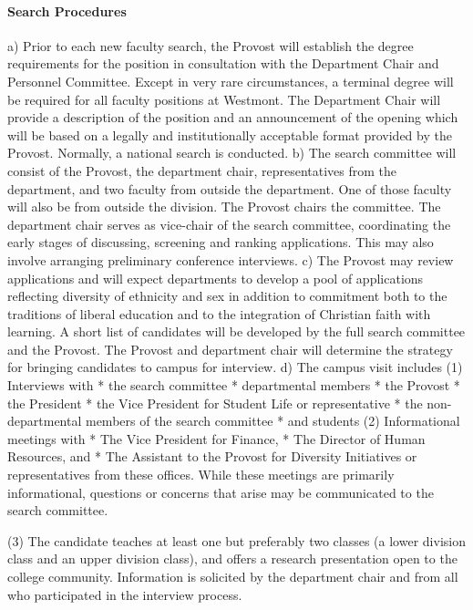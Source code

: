 \documentclass[letterpaper, 11pt]{article}
\begin{document}
			\paragraph{Search Procedures}
				a)  Prior to each new faculty search, the Provost will establish the degree requirements for the position in consultation with the Department Chair and Personnel Committee. Except in very rare circumstances, a terminal degree will be required for all faculty positions at Westmont.  The Department Chair will provide a description of the position and an announcement of the opening which will be based on a legally and institutionally acceptable format provided by the Provost.  Normally, a national search is conducted.
				b) The search committee will consist of the Provost, the department chair, representatives from the department, and two faculty from outside the department. One of those faculty will also be from outside the division. The Provost chairs the committee. The department chair serves as vice-chair of the search committee, coordinating the early stages of discussing, screening and ranking applications. This may also involve arranging preliminary conference interviews.
				c) The Provost may review applications and will expect departments to develop a pool of applications reflecting diversity of ethnicity and sex in addition to commitment both to the traditions of liberal education and to the integration of Christian faith with learning.  A short list of candidates will be developed by the full search committee and the Provost.  The Provost and department chair will determine the strategy for bringing candidates to campus for interview.
				d)  The campus visit includes
				(1) Interviews with
				* the search committee
				* departmental members
				* the Provost
				* the President
				* the Vice President for Student Life or representative
				* the non-departmental members of the search committee
				* and students
				(2) Informational meetings with
				* The Vice President for Finance,
				* The Director of Human Resources, and
				* The Assistant to the Provost for Diversity Initiatives or representatives from these offices.  While these meetings are primarily informational, questions or concerns that arise may be communicated to the search committee.

				(3) The candidate teaches at least one but preferably two classes (a lower division class and an upper division class), and offers a research presentation open to the college community.  Information is solicited by the department chair and from all who participated in the interview process.
\end{document}
